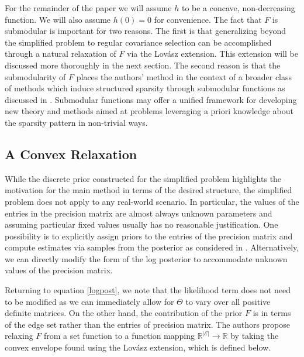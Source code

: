 \documentclass{uwstat572}
\theoremstyle{remark}
\theoremstyle{definition}
\begin{document}
For the remainder of the paper we will assume $h$ to be a concave, non-decreasing function.  We will also assume $h(0) = 0$ for convenience.  The fact that $F$ is submodular is important for two reasons.  The first is that generalizing beyond the simplified problem to regular covariance selection can be accomplished through a natural relaxation of $F$ via the Lov{\'a}sz extension.  This extension will be discussed more thoroughly in the next section.  The second reason is that the submodularity of $F$ places the authors' method in the context of a broader class of methods which induce structured sparsity through submodular functions as discussed in \cite{bach2010}. Submodular functions may offer a unified framework for developing new theory and methods aimed at problems leveraging a priori knowledge about the sparsity pattern in non-trivial ways.



\subsection{A Convex Relaxation}

While the discrete prior constructed for the simplified problem highlights the motivation for the main method in terms of the desired structure, the simplified problem does not apply to any real-world scenario.  In particular, the values of the entries in the precision matrix are almost always unknown parameters and assuming particular fixed values usually has no reasonable justification.  One possibility is to explicitly assign priors to the entries of the precision matrix and compute estimates via samples from the posterior as considered in \cite{sheridan2010}.  Alternatively, we can directly modify the form of the log posterior to accommodate unknown values of the precision matrix.  

Returning to equation \eqref{logpost}, we note that the likelihood term does not need to be modified as we can immediately allow for $\Theta$ to vary over all positive definite matrices.  On the other hand, the contribution of the prior $F$ is in terms of the edge set rather than the entries of precision matrix.  The authors propose relaxing $F$ from a set function to a function mapping $\mathbb{R}^{|\mathcal{E}|} \to \mathbb{R}$ by taking the convex envelope found using the Lov{\'a}sz extension, which is defined below.
\end{document}
